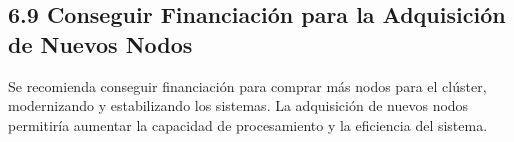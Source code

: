 \begin{spacing}{1.5}
\subsection{6.9 Conseguir Financiación para la Adquisición de Nuevos Nodos}

Se recomienda conseguir financiación para comprar más nodos para el clúster, modernizando y estabilizando los sistemas. La adquisición de nuevos nodos permitiría aumentar la capacidad de procesamiento y la eficiencia del sistema.

  \mylinespacing
  \mylinespacing
  \begin{tightcenter}
  \end{tightcenter}
\end{spacing}